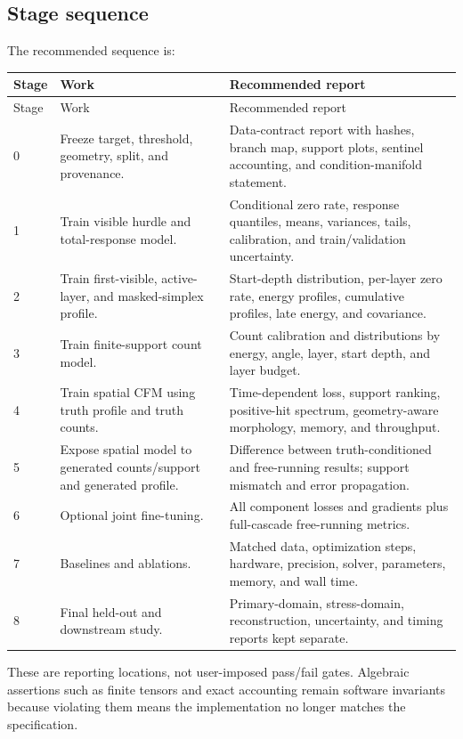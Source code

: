 \documentclass[11pt]{article}
\theoremstyle{definition}
\theoremstyle{remark}
\begin{document}
\subsection{Stage sequence}
The recommended sequence is:
\begin{longtable}{p{}p{}p{}}
\toprule
Stage & Work & Recommended report \\
\midrule
\endfirsthead
\toprule
Stage & Work & Recommended report \\
\midrule
\endhead
0 & Freeze target, threshold, geometry, split, and provenance. & Data-contract report with hashes, branch map, support plots, sentinel accounting, and condition-manifold statement. \\
1 & Train visible hurdle and total-response model. & Conditional zero rate, response quantiles, means, variances, tails, calibration, and train/validation uncertainty. \\
2 & Train first-visible, active-layer, and masked-simplex profile. & Start-depth distribution, per-layer zero rate, energy profiles, cumulative profiles, late energy, and covariance. \\
3 & Train finite-support count model. & Count calibration and distributions by energy, angle, layer, start depth, and layer budget. \\
4 & Train spatial CFM using truth profile and truth counts. & Time-dependent loss, support ranking, positive-hit spectrum, geometry-aware morphology, memory, and throughput. \\
5 & Expose spatial model to generated counts/support and generated profile. & Difference between truth-conditioned and free-running results; support mismatch and error propagation. \\
6 & Optional joint fine-tuning. & All component losses and gradients plus full-cascade free-running metrics. \\
7 & Baselines and ablations. & Matched data, optimization steps, hardware, precision, solver, parameters, memory, and wall time. \\
8 & Final held-out and downstream study. & Primary-domain, stress-domain, reconstruction, uncertainty, and timing reports kept separate. \\
\bottomrule
\end{longtable}
These are reporting locations, not user-imposed pass/fail gates. Algebraic assertions such as finite tensors and exact accounting remain software invariants because violating them means the implementation no longer matches the specification.
\end{document}
